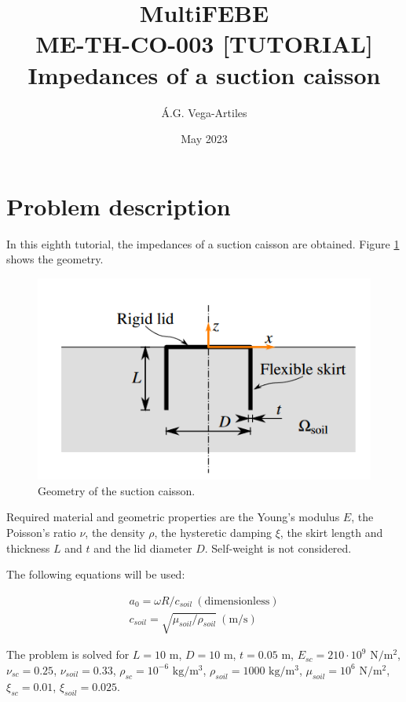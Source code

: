 \documentclass[a4]{article}
\title{MultiFEBE \\ ME-TH-CO-003 [TUTORIAL] \\ Impedances of a suction caisson}
\author{\'A.G. Vega-Artiles}
\date{May 2023}
\begin{document}
\maketitle

\tableofcontents

\section{Problem description}

In this eighth tutorial, the impedances of a suction caisson are obtained. Figure \ref{fig:geometry_suction_caisson} shows the geometry. 

\begin{figure}[tbh!]
	\centering
	\includegraphics[scale=0.6]{geometry_suction_caisson.png}
	\caption{Geometry of the suction caisson.}
	\label{fig:geometry_suction_caisson}
\end{figure}

Required material and geometric properties are the Young's modulus $E$, the Poisson's ratio $\nu$, the density $\rho$, the hysteretic damping $\xi$, the skirt length and thickness $L$ and $t$ and the lid diameter $D$. Self-weight is not considered.

The following equations will be used: 

\begin{equation}
	\begin{array}{l}
		a_0 = \omega R/c_{soil} \medspace \mathrm{(dimensionless)} \\
		c_{soil} = \sqrt{\mu_{soil}/\rho_{soil}}\medspace \mathrm{(m/s)} 
	\end{array}
\end{equation}

The problem is solved for $L=10$ $\mathrm{m}$, $D=10$ $\mathrm{m}$,  $t=0.05$ $\mathrm{m}$, $E_{sc} = 210 \cdot 10^9$ $\mathrm{N/m^2}$, $\nu_{sc}=0.25$, $\nu_{soil}=0.33$, $\rho_{sc}=10^{-6}$ $\mathrm{kg/m^3}$, $\rho_{soil}=1000$ $\mathrm{kg/m^3}$, $\mu_{soil}=10^{6}$ $\mathrm{N/m^2}$, $\xi_{sc}=0.01$, $\xi_{soil}=0.025$.
\end{document}

